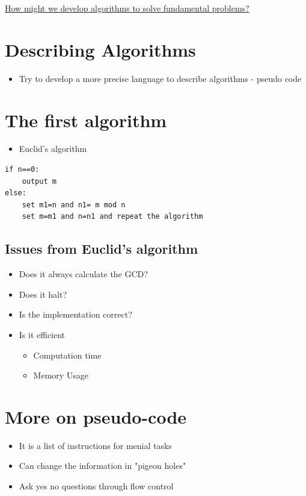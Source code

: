 \documentclass{article}[18pt]
\begin{document}
\begin{center}
\underline{\Large How might we develop algorithms to solve fundamental problems?}
\end{center}
\section{Describing Algorithms}
\begin{itemize}
	\item Try to develop a more precise language to describe algorithms - pseudo code
\end{itemize}
\section{The first algorithm}
\begin{itemize}
	\item Euclid's algorithm
\end{itemize}
\begin{verbatim}
if n==0:
	output m
else:
	set m1=n and n1= m mod n
	set m=m1 and n=n1 and repeat the algorithm
\end{verbatim}
\subsection{Issues from Euclid's algorithm}
\begin{itemize}
	\item Does it always calculate the GCD?
	\item Does it halt?
	\item Is the implementation correct?
	\item Is it efficient
	\begin{itemize}
		\item Computation time
		\item Memory Usage
	\end{itemize}
\end{itemize}
\section{More on pseudo-code}
\begin{itemize}
	\item It is a list of instructions for menial tasks
	\item Can change the information in "pigeon holes"
	\item Ask yes no questions through flow control
\end{itemize}
\end{document}
